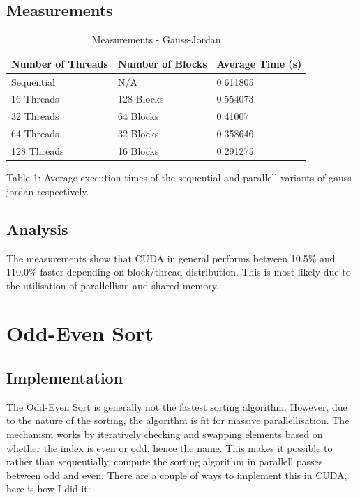 \documentclass[a4]{article}
\begin{document}
\subsection{Measurements}

\begin{table}[H]
	\caption{Measurements - Gauss-Jordan}
	\begin{center}
		\begin{tabular}{ | m{9em} | m{8em} | m{8em} |} 
			\hline
			Number of Threads & Number of Blocks & Average Time (s) \\
			\hline
			\hline
			Sequential & N/A & 0.611805 \\
			\hline
			\hline
			16 Threads & 128 Blocks & 0.554073 \\
			32 Threads & 64 Blocks & 0.41007 \\
			64 Threads & 32 Blocks & 0.358646 \\
			128 Threads & 16 Blocks & 0.291275 \\
			\hline
		\end{tabular}
	\end{center}
	\begin{tablenotes}
		\small
		\item Table 1: Average execution times of the sequential and parallell variants of gauss-jordan respectively. 
	\end{tablenotes}
\end{table}

\subsection{Analysis}

The measurements show that CUDA in general performs between 10.5\% and 110.0\% faster depending on block/thread distribution. This is most likely
due to the utilisation of parallellism and shared memory. 

\section{Odd-Even Sort}

\subsection{Implementation}

The Odd-Even Sort is generally not the fastest sorting algorithm. However, due to the nature of the sorting, the algorithm is fit for massive
parallellisation. The mechanism works by iteratively checking and swapping elements based on whether the index is even or odd, hence the name.
This makes it possible to rather than sequentially, compute the sorting algorithm in parallell passes between odd and even.
There are a couple of ways to implement this in CUDA, here is how I did it:
\end{document}
